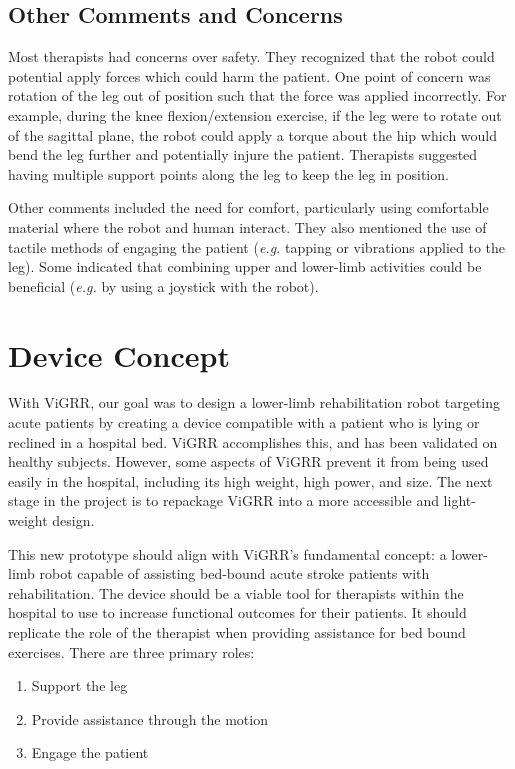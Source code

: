 \documentclass[12pt]{report}
\begin{document}
	\subsection{Other Comments and Concerns}
	
	Most therapists had concerns over safety. They recognized that the robot could potential apply forces which could harm the patient. One point of concern was rotation of the leg out of position such that the force was applied incorrectly. For example, during the knee flexion/extension exercise, if the leg were to rotate out of the sagittal plane, the robot could apply a torque about the hip which would bend the leg further and potentially injure the patient. Therapists suggested having multiple support points along the leg to keep the leg in position. 
	
	Other comments included the need for comfort, particularly using comfortable material where the robot and human interact. They also mentioned the use of tactile methods of engaging the patient (\textit{e.g.} tapping or vibrations applied to the leg). Some indicated that combining upper and lower-limb activities could be beneficial (\textit{e.g.} by using a joystick with the robot). 
	
	
\section{Device Concept} 

With ViGRR, our goal was to design a lower-limb rehabilitation robot targeting acute patients by creating a device compatible with a patient who is lying or reclined in a hospital bed. ViGRR accomplishes this, and has been validated on healthy subjects. However, some aspects of ViGRR prevent it from being used easily in the hospital, including its high weight, high power, and size. The next stage in the project is to repackage ViGRR into a more accessible and light-weight design. 

This new prototype should align with ViGRR's fundamental concept: a lower-limb robot capable of assisting bed-bound acute stroke patients with rehabilitation. The device should be a viable tool for therapists within the hospital to use to increase functional outcomes for their patients. It should replicate the role of the therapist when providing assistance for bed bound exercises. There are three primary roles:

\begin{enumerate}
	\item Support the leg 
	\item Provide assistance through the motion
	\item Engage the patient
\end{enumerate}
\end{document}
